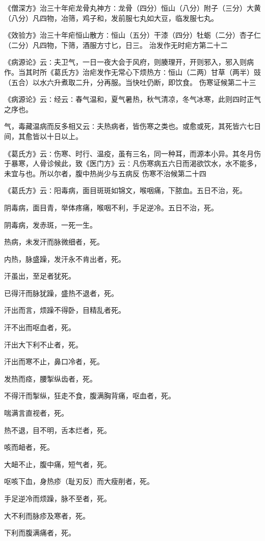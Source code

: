 \documentclass[a4paper,12pt,UTF8,twoside]{ctexbook}
\begin{document}
《僧深方》治三十年疟龙骨丸神方∶龙骨（四分）恒山（八分）附子（三分）大黄（八分）凡四物，冶筛，鸡子和，发前服七丸如大豆，临发服七丸。

《效验方》治三十年疟恒山散方∶恒山（五分）干漆（四分）牡蛎（二分）杏子仁（二分）凡四物，下筛，酒服方寸匕，日三。
治发作无时疟方第二十二

《病源论》云∶夫卫气，一日一夜大会于风府，则腠理开，开则邪入，邪入则病作。当其时所《葛氏方》治疟发作无常心下烦热方∶恒山（二两）甘草（两半）豉（五合）以水六升煮取二升，分再服。当快吐仍断，即饮食。
伤寒证候第二十三

《病源论》云∶经云∶春气温和，夏气暑热，秋气清凉，冬气冰寒，此则四时正气之序也。

气，毒藏温病而反多相又云∶夫热病者，皆伤寒之类也。或愈或死，其死皆六七日间，其愈皆以十日以上。

《葛氏方》云∶伤寒、时行、温疫，虽有三名，同一种耳，而源本小异。其冬月伤于暴寒，人骨诊候此，致《医门方》云∶凡伤寒病五六日而渴欲饮水，水不能多，未宜与也。所以尔者，腹中热尚少与五病反
伤寒不治候第二十四

《葛氏方》云∶阳毒病，面目斑斑如锦文，喉咽痛，下脓血。五日不治，死。

阴毒病，面目青，举体疼痛，喉咽不利，手足逆冷。五日不治，死。

阴毒病，发赤斑，一死一生。

热病，未发汗而脉微细者，死。

内热，脉盛躁，发汗永不肯出者，死。

汗虽出，至足者犹死。

已得汗而脉犹躁，盛热不退者，死。

汗出而言，烦躁不得卧，目精乱者死。

汗不出而呕血者，死。

汗出大下利不止者，死。

汗出而寒不止，鼻口冷者，死。

发热而痉，腰掣纵齿者，死。

不得汗而掣纵，狂走不食，腹满胸背痛，呕血者，死。

喘满言直视者，死。

热不退，目不明，舌本烂者，死。

咳而衄者，死。

大衄不止，腹中痛，短气者，死。

呕咳下血，身热疹（耻刃反）而大瘦削者，死。

手足逆冷而烦躁，脉不至者，死。

大不利而脉疹及寒者，死。

下利而腹满痛者，死。
\end{document}
